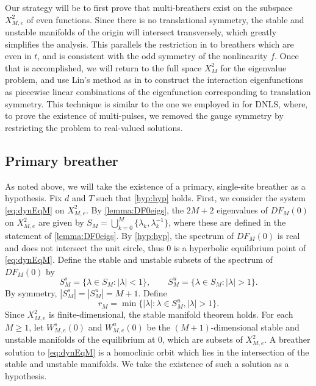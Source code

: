 \documentclass[12pt,reqno]{amsart}
\theoremstyle{definition}
\begin{document}
Our strategy will be to first prove that multi-breathers exist on the subspace $X_{M,e}^2$ of even functions. Since there is no translational symmetry, the stable and unstable manifolds of the origin will intersect transversely, which greatly simplifies the analysis. This parallels the restriction in \cite{Pelinovsky2012} to breathers which are even in $t$, and is consistent with the odd symmetry of the nonlinearity $f$. 
Once that is accomplished, we will return to the full space $X_{M}^2$ for the eigenvalue problem, and use Lin's method as in \cites{Parker2021,Parker2020,Sandstede1998} to construct the interaction eigenfunctions as piecewise linear combinations of the eigenfunction corresponding to translation symmetry. This technique is similar to the one we employed in \cite{Parker2020} for DNLS, where, to prove the existence of multi-pulses, we removed the gauge symmetry by restricting the problem to real-valued solutions.

\subsection{Primary breather}

As noted above, we will take the existence of a primary, single-site breather as a hypothesis. 
Fix $d$ and $T$ such that \cref{hyp:hyp} holds. First, we consider the system \cref{eq:dynEqM} on $X_{M,e}^2$. By \cref{lemma:DF0eigs}, the $2M+2$ eigenvalues of $DF_M(0)$ on $X_{M,e}^2$ are given by $S_M = \bigcup_{k=0}^M \{\lambda_k, \lambda_k^{-1} \}$, where these are defined in the statement of \cref{lemma:DF0eigs}. By \cref{hyp:hyp}, the spectrum of $DF_M(0)$ is real and does not intersect the unit circle, thus 0 is a hyperbolic equilibrium point of \cref{eq:dynEqM}. Define the stable and unstable subsets of the spectrum of $DF_M(0)$ by
\[
S_M^s = \{ \lambda \in S_M : |\lambda| < 1\}, \qquad S_M^u = \{ \lambda \in S_M : |\lambda| > 1\}.
\]
By symmetry, $|S_M^s| = |S_M^u| = M+1$. Define
\begin{equation}\label{eq:defrM}
r_M = \min \{ |\lambda| : \lambda \in S_M^u, |\lambda| > 1 \}.
\end{equation}
Since $X_{M,e}^2$ is finite-dimensional, the stable manifold theorem holds. For each $M \geq 1$, let $W_{M,e}^s(0)$ and $W_{M,e}^u(0)$ be the $(M+1)$-dimensional stable and unstable manifolds of the equilibrium at 0, which are subsets of $X_{M,e}^2$. A breather solution to \cref{eq:dynEqM} is a homoclinic orbit which lies in the intersection of the stable and unstable manifolds. We take the existence of such a solution as a hypothesis.
\end{document}
